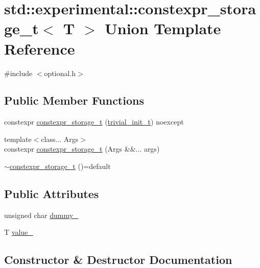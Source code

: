 \hypertarget{unionstd_1_1experimental_1_1constexpr__storage__t}{}\section{std\+:\+:experimental\+:\+:constexpr\+\_\+storage\+\_\+t$<$ T $>$ Union Template Reference}
\label{unionstd_1_1experimental_1_1constexpr__storage__t}


{\ttfamily \#include $<$optional.\+h$>$}

\subsection*{Public Member Functions}
\begin{DoxyCompactItemize}
\item 
constexpr \mbox{\hyperlink{unionstd_1_1experimental_1_1constexpr__storage__t_a453f1fc4d9790ed1a15175a9c13fe517}{constexpr\+\_\+storage\+\_\+t}} (\mbox{\hyperlink{structstd_1_1experimental_1_1trivial__init__t}{trivial\+\_\+init\+\_\+t}}) noexcept
\item 
{\footnotesize template$<$class... Args$>$ }\\constexpr \mbox{\hyperlink{unionstd_1_1experimental_1_1constexpr__storage__t_a643de5b95dac28e87811c7ff4890cd19}{constexpr\+\_\+storage\+\_\+t}} (Args \&\&... args)
\item 
\mbox{\hyperlink{unionstd_1_1experimental_1_1constexpr__storage__t_a91464aa4649be3df9952707782a58a6d}{$\sim$constexpr\+\_\+storage\+\_\+t}} ()=default
\end{DoxyCompactItemize}
\subsection*{Public Attributes}
\begin{DoxyCompactItemize}
\item 
unsigned char \mbox{\hyperlink{unionstd_1_1experimental_1_1constexpr__storage__t_abab3e99e25b519d05a2b32c3748cf759}{dummy\+\_\+}}
\item 
T \mbox{\hyperlink{unionstd_1_1experimental_1_1constexpr__storage__t_ab0f056b5b1e7bfde0dc04629fd0b9ade}{value\+\_\+}}
\end{DoxyCompactItemize}


\subsection{Constructor \& Destructor Documentation}
\mbox{\label{unionstd_1_1experimental_1_1constexpr__storage__t_a453f1fc4d9790ed1a15175a9c13fe517}} 
